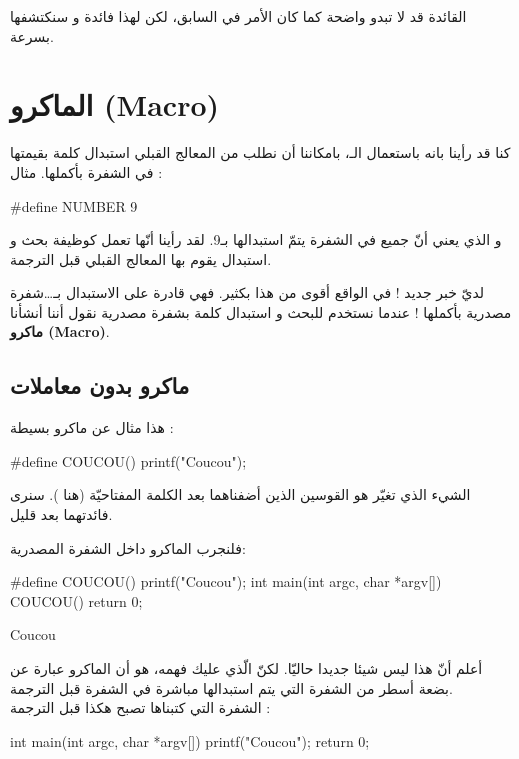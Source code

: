 القائدة قد لا تبدو واضحة كما كان الأمر في السابق، لكن لهذا فائدة و سنكتشفها بسرعة.

\section{الماكرو (\textenglish{Macro})}

كنا قد رأينا بانه باستعمال الـ،
بامكاننا أن نطلب من المعالج القبلي استبدال كلمة بقيمتها في الشفرة بأكملها. مثال :

\begin{Csource}
#define NUMBER 9
\end{Csource}

و الذي يعني أنّ جميع
في الشفرة يتمّ استبدالها بـ9. لقد رأينا أنّها تعمل كوظيفة بحث و استبدال يقوم بها المعالج القبلي قبل الترجمة.

لديّ خبر جديد ! في الواقع
أقوى من هذا بكثير. فهي قادرة على الاستبدال بـ\dots شفرة مصدرية بأكملها ! عندما نستخدم
للبحث و استبدال كلمة بشفرة مصدرية نقول أننا أنشأنا
\textbf{ماكرو
(\textenglish{Macro})}.

\subsection{ماكرو بدون معاملات}

هذا مثال عن ماكرو بسيطة :

\begin{Csource}
#define COUCOU() printf("Coucou");
\end{Csource}

الشيء الذي تغيّر هو القوسين الذين أضفناهما بعد الكلمة المفتاحيّة (هنا
).
سنرى فائدتهما بعد قليل.

فلنجرب الماكرو داخل الشفرة المصدرية:

\begin{Csource}
#define COUCOU() printf("Coucou");
int main(int argc, char *argv[])
{
  COUCOU()
  return 0;
}
\end{Csource}

\begin{Console}
Coucou
\end{Console}

أعلم أنّ هذا ليس شيئا جديدا حاليّا. لكنّ الّذي عليك فهمه، هو أن الماكرو عبارة عن بضعة أسطر من الشفرة التي يتم استبدالها مباشرة في الشفرة قبل الترجمة.\\
الشفرة التي كتبناها تصبح هكذا قبل الترجمة :

\begin{Csource}
int main(int argc, char *argv[])
{
	printf("Coucou");
	return 0;
}
\end{Csource}


